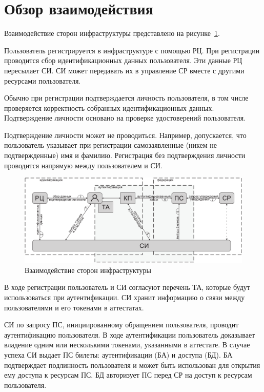 \section{Обзор взаимодействия}\label{COMMON.Overview}

Взаимодействие сторон инфраструктуры представлено на 
рисунке~\ref{Fig.COMMON.Bias}.

Пользователь регистрируется в инфраструктуре с помощью РЦ. При регистрации
проводится сбор идентификационных данных пользователя. Эти данные РЦ пересылает 
СИ. СИ может передавать их в управление СР вместе с другими ресурсами пользователя. 

Обычно при регистрации подтверждается личность пользователя, в том числе 
проверяется корректность собранных идентификационных данных. Подтверждение 
личности основано на проверке удостоверений пользователя.

Подтверждение личности может не проводиться. Например, допускается, что пользователь
указывает при регистрации самозаявленные (никем не подтвержденные) имя и
фамилию. Регистрация без подтверждения личности проводится напрямую между
пользователем и СИ.

\begin{figure}[hbt]
\begin{center}
\includegraphics[width=17cm]{../figs/bias}
\end{center}
\caption{Взаимодействие сторон инфраструктуры}
\label{Fig.COMMON.Bias}
\end{figure}


В ходе регистрации пользователь и СИ согласуют перечень ТА, которые будут 
использоваться при аутентификации. СИ хранит информацию о связи между 
пользователями и его токенами в аттестатах.

СИ по запросу ПС, инициированному обращением пользователя, проводит
аутентификацию пользователя. В ходе аутентификации пользователь доказывает
владение одним или несколькими токенами, указанными в аттестате.
%
В случае успеха СИ выдает ПС билеты: аутентификации (БА) и доступа (БД). 
%
БА подтверждает подлинность пользователя и может быть использован
для открытия ему доступа к ресурсам ПС.
%
БД авторизует ПС перед СР на доступ к ресурсам пользователя.

